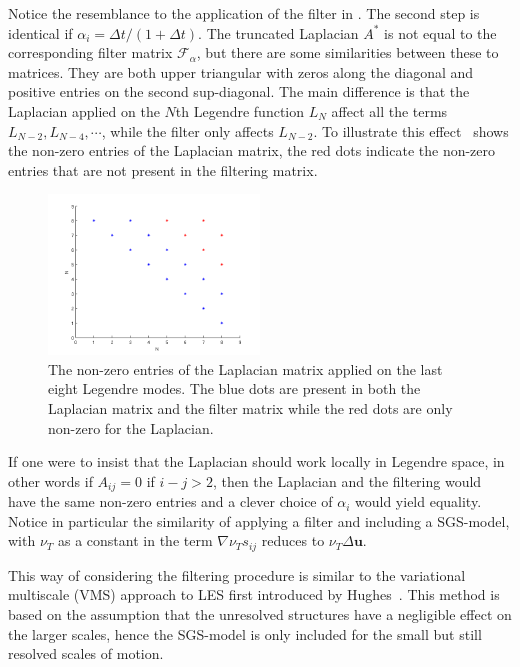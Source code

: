 Notice the resemblance to the application of the filter in . The second step
is identical if $\alpha_i = \Delta t/(1+\Delta t)$. The truncated Laplacian $A^*$ is not equal to the corresponding
filter matrix $\mathcal{F}_{\alpha}$, but there are some similarities between these to matrices.
They are both upper triangular with zeros along the diagonal and positive entries on the second 
sup-diagonal. The main difference is that the Laplacian applied on the $N$th Legendre function 
$L_N$ affect all the terms $L_{N-2},L_{N-4},\cdots$, while the filter only affects $L_{N-2}$.
To illustrate this effect~ shows the non-zero entries of the
Laplacian matrix, the red dots indicate the non-zero entries that are not present in the filtering
matrix.
%
\begin{figure}[h]
	\centering
	\includegraphics[width=0.5\textwidth]{Figures/matrix.png}
	\caption{The non-zero entries of the Laplacian matrix applied on the last eight Legendre modes.
    The blue dots are present in both the Laplacian matrix and the filter matrix
    while the red dots are only non-zero for the Laplacian.}
	\label{fig:entries}
\end{figure}
%
If one were to insist that the Laplacian should work locally in Legendre space, in other words 
if $A_{ij}=0$ if $i-j>2$, then the Laplacian and the filtering would have the same non-zero entries 
and a clever choice of $\alpha_i$ would yield equality. Notice in particular the similarity of 
applying a filter and including a SGS-model, with $\nu_T$ as a constant in  the term 
$\nabla \nu_Ts_{ij}$ reduces to $\nu_T\Delta \mathbf{u}$.

This way of considering the filtering procedure is similar to the variational multiscale (VMS) 
approach to LES first introduced by Hughes~\cite{Hughes}. This method is based on the assumption that
the unresolved structures have a negligible effect on the larger scales, hence the SGS-model is 
only included for the small but still resolved scales of motion.


